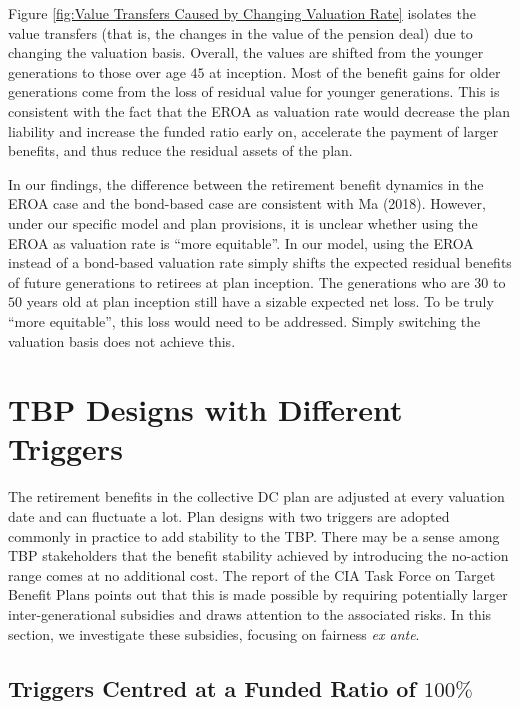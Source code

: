\documentclass{sfuthesis}
\numberwithin{equation}{chapter}
\begin{document}
		\vspace{-0.4cm}
		
		\justify
		Figure \ref{fig:Value Transfers Caused by Changing Valuation Rate} isolates the value transfers (that is, the changes in the value of the pension deal) due to changing the valuation basis. Overall, the values are shifted from the younger generations to those over age $45$ at inception. Most of the benefit gains for older generations come from the loss of residual value for younger generations. This is consistent with the fact that the EROA as valuation rate would decrease the plan liability and increase the funded ratio early on, accelerate the payment of larger benefits, and thus reduce the residual assets of the plan.
    
    
    	\justify
		In our findings, the difference between the retirement benefit dynamics in the EROA case and the bond-based case are consistent with Ma (2018). However, under our specific model and plan provisions, it is unclear whether using the EROA as valuation rate is ``more equitable''. In our model, using the EROA instead of a bond-based valuation rate simply shifts the expected residual benefits of future generations to retirees at plan inception. The generations who are $30$ to $50$ years old at plan inception still have a sizable expected net loss. To be truly ``more equitable'', this loss would need to be addressed. Simply switching the valuation basis does not achieve this.

	
	
	\section{TBP Designs with Different Triggers}
	\label{TBP Designs with Different Triggers}
	
		\justify
		The retirement benefits in the collective DC plan are adjusted at every valuation date and can fluctuate a lot. Plan designs with two triggers are adopted commonly in practice to add stability to the TBP. There may be a sense among TBP stakeholders that the benefit stability achieved by introducing the no-action range comes at no additional cost. The report of the CIA Task Force on Target Benefit Plans \citep{cia2015b} points out that this is made possible by requiring potentially larger inter-generational subsidies and draws attention to the associated risks. In this section, we investigate these subsidies, focusing on fairness \textit{ex ante}.
	
	
	\subsection{Triggers Centred at a Funded Ratio of $100\%$}
	\label{Triggers Centered at a Funded Ratio of 100}
	
\end{document}
